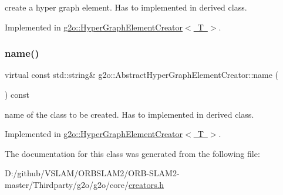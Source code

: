 create a hyper graph element. Has to implemented in derived class. 

Implemented in \mbox{\hyperlink{classg2o_1_1_hyper_graph_element_creator_af5e58366dd05b49700076e0c4ace31e3}{g2o\+::\+Hyper\+Graph\+Element\+Creator$<$ T $>$}}.

\mbox{\label{classg2o_1_1_abstract_hyper_graph_element_creator_a238928fbbfd6e473b2c61002112e6f5f}} 
\subsubsection{\texorpdfstring{name()}{name()}}
{\footnotesize\ttfamily virtual const std\+::string\& g2o\+::\+Abstract\+Hyper\+Graph\+Element\+Creator\+::name (\begin{DoxyParamCaption}{ }\end{DoxyParamCaption}) const\hspace{0.3cm}{\ttfamily [pure virtual]}}

name of the class to be created. Has to implemented in derived class. 

Implemented in \mbox{\hyperlink{classg2o_1_1_hyper_graph_element_creator_a9350df173e72ccb4bb6594d282a2c0e7}{g2o\+::\+Hyper\+Graph\+Element\+Creator$<$ T $>$}}.



The documentation for this class was generated from the following file\+:\begin{DoxyCompactItemize}
\item 
D\+:/github/\+V\+S\+L\+A\+M/\+O\+R\+B\+S\+L\+A\+M2/\+O\+R\+B-\/\+S\+L\+A\+M2-\/master/\+Thirdparty/g2o/g2o/core/\mbox{\hyperlink{creators_8h}{creators.\+h}}\end{DoxyCompactItemize}
